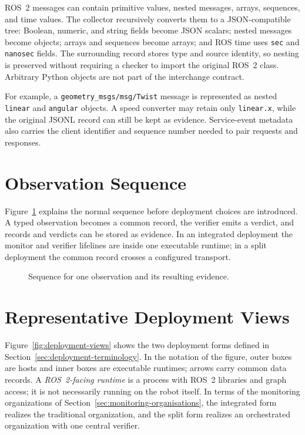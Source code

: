 ROS~2 messages can contain primitive values, nested messages, arrays,
sequences, and time values. The collector recursively converts them to a
JSON-compatible tree: Boolean, numeric, and string fields become JSON scalars;
nested messages become objects; arrays and sequences become arrays; and ROS
time uses \texttt{sec} and \texttt{nanosec} fields. The surrounding record
stores type and source identity, so nesting is preserved without requiring a
checker to import the original ROS~2 class. Arbitrary Python objects are not
part of the interchange contract.

For example, a \texttt{geometry\_msgs/msg/Twist} message is represented as
nested \texttt{linear} and \texttt{angular} objects. A speed converter may
retain only \texttt{linear.x}, while the original JSONL record can still be
kept as evidence. Service-event metadata also carries the client identifier and
sequence number needed to pair requests and responses.

\section{Observation Sequence}

Figure~\ref{fig:observation-sequence} explains the normal sequence before
deployment choices are introduced. A typed observation becomes a common record,
the verifier emits a verdict, and records and verdicts can be stored as
evidence. In an integrated deployment the monitor and verifier lifelines are
inside one executable runtime; in a split deployment the common record crosses
a configured transport.

\begin{figure}[htbp]
  \centering
  \resizebox{.96\textwidth}{!}{}
  \caption{Sequence for one observation and its resulting evidence.}
  \label{fig:observation-sequence}
\end{figure}

\section{Representative Deployment Views}\label{sec:deployment-views}

Figure~\ref{fig:deployment-views} shows the two deployment forms defined in
Section~\ref{sec:deployment-terminology}. In the notation of the figure, outer
boxes are hosts and inner boxes are executable runtimes; arrows carry common
data records. A \emph{ROS~2-facing runtime} is a process with ROS~2 libraries
and graph access; it is not necessarily running on the robot itself. In terms
of the monitoring organizations of
Section~\ref{sec:monitoring-organisations}, the integrated form realizes the
traditional organization, and the split form realizes an orchestrated
organization with one central verifier.

